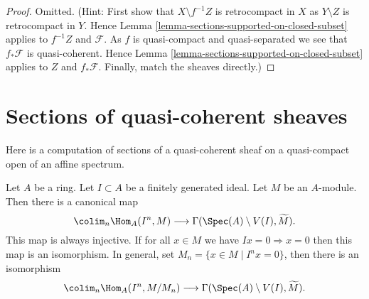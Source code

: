 \begin{proof}
Omitted. (Hint: First show that $X \setminus f^{-1}Z$ is retrocompact
in $X$ as $Y \setminus Z$ is retrocompact in $Y$. Hence
Lemma \ref{lemma-sections-supported-on-closed-subset}
applies to $f^{-1}Z$ and $\mathcal{F}$. As $f$ is quasi-compact and
quasi-separated we see that $f_*\mathcal{F}$ is quasi-coherent.
Hence Lemma \ref{lemma-sections-supported-on-closed-subset}
applies to $Z$ and $f_*\mathcal{F}$. Finally, match the sheaves
directly.)
\end{proof}








\section{Sections of quasi-coherent sheaves}
\label{section-sections-quasi-coherent}

\noindent
Here is a computation of sections of a quasi-coherent sheaf on a quasi-compact
open of an affine spectrum.

\begin{lemma}
\label{lemma-sections-over-quasi-compact-open-in-affine}
Let $A$ be a ring.
Let $I \subset A$ be a finitely generated ideal.
Let $M$ be an $A$-module.
Then there is a canonical map
$$
\colim_n \Hom_A(I^n, M)
\longrightarrow
\Gamma(\Spec(A) \setminus V(I), \widetilde{M}).
$$
This map is always injective.
If for all $x \in M$ we have $Ix = 0 \Rightarrow x = 0$
then this map is an isomorphism. In general, set
$M_n = \{x \in M \mid I^nx = 0\}$, then there is an
isomorphism
$$
\colim_n \Hom_A(I^n, M/M_n)
\longrightarrow
\Gamma(\Spec(A) \setminus V(I), \widetilde{M}).
$$
\end{lemma}

